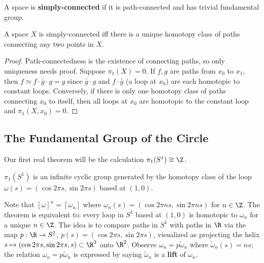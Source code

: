 \begin{definition}
\label{def:simply-connected}
A space is \textbf{simply-connected} if it is path-connected and has trivial
fundamental group.
\end{definition}

\begin{proposition}
\label{prop:simply-connected-iff-unique-path-class}
A space $X$ is simply-connected iff there is a unique homotopy class of paths
connecting any two points in $X$.
\end{proposition}

\begin{proof}
Path-connectedness is the existence of connecting paths, so only uniqueness needs
proof. Suppose $\pi_1(X) = 0$. If $f,g$ are paths from $x_0$ to $x_1$, then
$f \simeq f\cdot\bar g\cdot g = g$ since $\bar g\cdot g$ and $f\cdot\bar g$ (a loop at $x_0$) are each
homotopic to constant loops. Conversely, if there is only one homotopy class of
paths connecting $x_0$ to itself, then all loops at $x_0$ are homotopic to the constant
loop and $\pi_1(X,x_0) = 0$.
\end{proof}

\subsection*{The Fundamental Group of the Circle}

Our first real theorem will be the calculation $\pi_1(S^1) \cong \Z$.

\begin{theorem}
\label{thm:fundamental-group-of-circle}
$\pi_1(S^1)$ is an infinite cyclic group generated by the homotopy class of the loop
$\omega(s) = (\cos 2\pi s, \sin 2\pi s)$ based at $(1,0)$.
\end{theorem}

Note that $[\omega]^n = [\omega_n]$ where $\omega_n(s) = (\cos 2\pi n s, \sin 2\pi n s)$ for $n \in \Z$. The
theorem is equivalent to: every loop in $S^1$ based at $(1,0)$ is homotopic to $\omega_n$ for a
unique $n \in \Z$. The idea is to compare paths in $S^1$ with paths in $\R$ via the map
$p : \R \to S^1$, $p(s) = (\cos 2\pi s, \sin 2\pi s)$, visualized as projecting the helix
$s \mapsto (\cos 2\pi s, \sin 2\pi s, s) \subset \R^3$ onto $\R^2$. Observe $\omega_n = p\tilde\omega_n$ where
$\tilde\omega_n(s) = ns$; the relation $\omega_n = p\tilde\omega_n$ is expressed by saying $\tilde\omega_n$ is a \textbf{lift} of
$\omega_n$.




